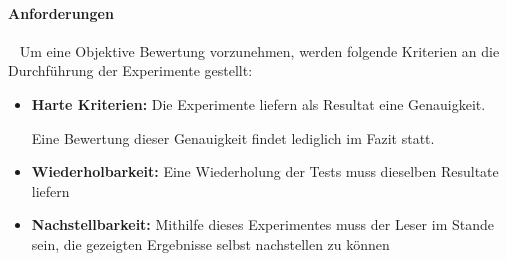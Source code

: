\paragraph{Anforderungen} ~\newline
Um eine Objektive Bewertung vorzunehmen, werden folgende Kriterien an die Durchführung der Experimente gestellt: 

\begin{itemize}
	\item \textbf{Harte Kriterien:} Die Experimente liefern als Resultat eine Genauigkeit. 
	
	Eine Bewertung dieser Genauigkeit findet lediglich im Fazit statt. 
	\item \textbf{Wiederholbarkeit:} Eine Wiederholung der Tests muss dieselben Resultate liefern
	\item \textbf{Nachstellbarkeit:} Mithilfe dieses Experimentes muss der Leser im Stande sein, die gezeigten Ergebnisse selbst nachstellen zu können
\end{itemize}